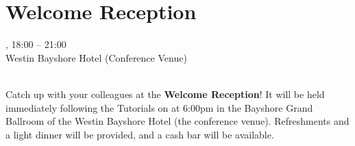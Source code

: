 \clearpage
\section[Welcome Reception]{Welcome Reception}
\setheaders{}{\daydateyear}

\begin{center}


\daydateyear, 18:00 -- 21:00 \vspace{1em}\\
Westin Bayshore Hotel (Conference Venue)\\
\WelcomeReceptionLoc\\
\end{center}

\noindent Catch up with your colleagues at the \textbf{Welcome
Reception}! It will be held immediately following the Tutorials
on \daydate at 6:00pm in the Bayshore Grand Ballroom of the Westin
Bayshore Hotel (the conference venue). Refreshments and a light
dinner will be provided, and a cash bar will be available.
